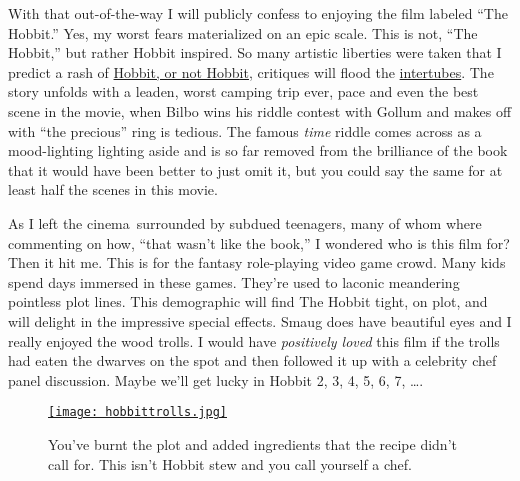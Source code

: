 With that out-of-the-way I will publicly confess to enjoying the film
labeled ``The Hobbit.'' Yes, my worst fears materialized on an epic
scale. This is not, ``The Hobbit,'' but rather Hobbit inspired. So many
artistic liberties were taken that I predict a rash of
\href{http://www.librarything.com/topic/146051}{Hobbit, or not Hobbit},
critiques will flood the
\href{http://www.urbandictionary.com/define.php?term=intertubes}{intertubes}.
The story unfolds with a leaden, worst camping trip ever, pace and even
the best scene in the movie, when Bilbo wins his riddle contest with
Gollum and makes off with ``the precious'' ring is tedious. The famous
\emph{time} riddle comes across as a mood-lighting lighting aside and is
so far removed from the brilliance of the book that it would have been
better to just omit it, but you could say the same for at least half
the scenes in this movie.

As I left the cinema~surrounded by subdued teenagers, many of whom where
commenting on how, ``that wasn't like the book,'' I wondered who is this
film for? Then it hit me. This is for the fantasy role-playing video
game crowd. Many kids spend days immersed in these games. They're used
to laconic meandering pointless plot lines. This demographic will find
The Hobbit tight, on plot, and will delight in the impressive special
effects. Smaug does have beautiful eyes and I really enjoyed the wood
trolls. I would have \emph{positively loved} this film if the trolls had
eaten the dwarves on the spot and then followed it up with a celebrity
chef panel discussion. Maybe we'll get lucky in Hobbit 2, 3, 4, 5, 6, 7,
\ldots{}.



\captionsetup[figure]{labelformat=empty}
\begin{figure}[htbp]
\centering
\href{http://bakerjd99.wordpress.com/2012/12/16/king-hobbit-kong/hobbittrolls/}{\texttt{[image: hobbittrolls.jpg]}}
\caption[This isn't Hobbit stew and you call yourself a chef]{You've burnt the plot and added ingredients that the recipe didn't call
for. This isn't Hobbit stew and you call yourself a chef.}
\label{fig:3538X0}
\end{figure}





%
